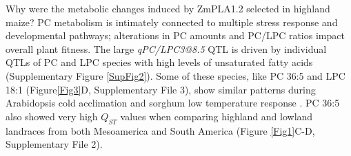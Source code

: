 \documentclass[9pt,twocolumn,twoside,lineno]{BioRxiv}
\begin{document}
Why were the metabolic changes induced by ZmPLA1.2 selected in highland maize?
PC metabolism is intimately connected to multiple stress response and developmental pathways; alterations in PC amounts and PC/LPC ratios impact overall plant fitness.
The large \textit{qPC/LPC3@8.5} QTL is driven by individual QTLs of PC and LPC species with high levels of unsaturated fatty acids (Supplementary Figure \ref{SupFig2}).
Some of these species, like PC 36:5 and LPC 18:1  (Figure\ref{Fig3}D, Supplementary File 3), show similar patterns during Arabidopsis cold acclimation \cite{Welti2002-uk} and sorghum low temperature response \cite{Marla2017-ph}.
PC 36:5 also showed very high $Q_{ST}$ values when comparing highland and lowland landraces from both Mesoamerica and South America (Figure \ref{Fig1}C-D, Supplementary File 2).
\end{document}
